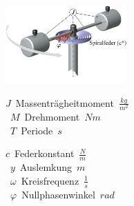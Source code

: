 \begin{center}
	\begin{minipage}{0.3\textwidth}
	\end{minipage}%
	\begin{minipage}{0.3\textwidth}
		\includegraphics[height=3cm,keepaspectratio=true]{Images/drehpendel.png}
	\end{minipage}
\end{center}
\begin{center}
	\begin{minipage}{0.3\textwidth}
		\unit{$J$}{Massenträgheitmoment}{$\frac{kg}{m^2}$} \\
		\unit{$M$}{Drehmoment}{$N m$} \\
		\unit{$T$}{Periode}{$s$}
	\end{minipage}%
	\begin{minipage}{0.3\textwidth}
		\unit{$c$}{Federkonstant}{$\frac{N}{m}$} \\
		\unit{$y$}{Auslemkung}{$m$} \\
		\unit{$\omega$}{Kreisfrequenz}{$\frac{1}{s}$} \\
		\unit{$\varphi$}{Nullphasenwinkel}{$rad$}	
	\end{minipage}
\end{center}







